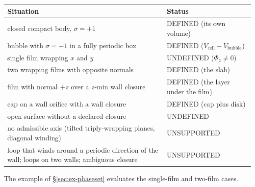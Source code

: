 \begin{center}\small
\begin{tabularx}{\textwidth}{@{}Xl@{}}
\toprule
Situation & Status \\
\midrule
closed compact body, $\sigma=+1$ & DEFINED (its own volume) \\
bubble with $\sigma=-1$ in a fully periodic box & DEFINED ($V_{\text{cell}}-V_{\text{bubble}}$) \\
single film wrapping $x$ and $y$ & UNDEFINED ($\Phi_z\neq0$) \\
two wrapping films with opposite normals & DEFINED (the slab) \\
film with normal $+z$ over a $z$-min wall closure & DEFINED (the layer under the film) \\
cap on a wall orifice with a wall closure & DEFINED (cap plus disk) \\
open surface without a declared closure & UNDEFINED \\
no admissible axis (tilted triply-wrapping planes, diagonal winding) & UNSUPPORTED \\
loop that winds around a periodic direction of the wall; loops on two walls; ambiguous closure & UNSUPPORTED \\
\bottomrule
\end{tabularx}
\end{center}

The example of \S\ref{sec:ex-phaseset} evaluates the single-film and two-film cases.
